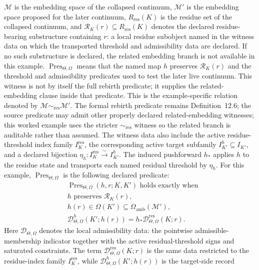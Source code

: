 \(\mathcal{M}\) is the embedding space of the collapsed continuum,
\(\mathcal{M}'\) is the embedding space proposed for the later continuum,
\(R_{\mathrm{res}}(K)\) is the residue set of the collapsed continuum, and
\(\mathcal{R}_K(r)\subseteq R_{\mathrm{res}}(K)\) denotes the declared
residue-bearing substructure containing \(r\): a local residue subobject named
in the witness data on which the transported threshold and admissibility data
are declared. If no such substructure is declared, the related embedding
branch is not available in this example.
\(\operatorname{Pres}_{\Theta,\Omega}\) means that the named map \(h\)
preserves \(\mathcal{R}_K(r)\) and the threshold and admissibility
predicates used to test the later live continuum. This witness is not by
itself the full rebirth predicate; it supplies the related-embedding clause
inside that predicate. This is the
example-specific relation denoted by
\(\mathcal{M}\sim_{\mathrm{res}}\mathcal{M}'\). The formal rebirth predicate
remains Definition~12.6; the source predicate may admit other properly
declared
related-embedding witnesses; this worked example uses the stricter
\(\sim_{\mathrm{res}}\) witness so the related branch is auditable rather than
assumed.
The witness data also include the active residue-threshold index family
\(I_K^{\mathrm{res}}\), the corresponding active target subfamily
\(I_{K'}^{h}\subseteq I_{K'}\), and a declared bijection
\(\eta_h:I_K^{\mathrm{res}}\xrightarrow{\sim}I_{K'}^{h}\). The induced
pushforward \(h_\ast\) applies \(h\) to the residue state and transports each
named residual threshold by \(\eta_h\).
For this example, \(\operatorname{Pres}_{\Theta,\Omega}\) is the following
declared predicate:
\[
\begin{aligned}
&\operatorname{Pres}_{\Theta,\Omega}(h,r;K,K')
  \text{ holds exactly when}\\
&h \text{ preserves } \mathcal{R}_K(r),\\
&h(r)\in\Omega(K')\subseteq\Omega_{\mathrm{amb}}(\mathcal{M}'),\\
&\mathcal{D}^{h}_{\Theta,\Omega}(K';h(r))
  =h_{\ast}\mathcal{D}^{\mathrm{res}}_{\Theta,\Omega}(K;r).
\end{aligned}
\]
Here \(\mathcal{D}_{\Theta,\Omega}\) denotes the local admissibility data:
the pointwise admissible-membership indicator together with the active residual-threshold signs
and saturated constraints. The term
\(\mathcal{D}^{\mathrm{res}}_{\Theta,\Omega}(K;r)\) is the same data restricted
to the residue-index family \(I_K^{\mathrm{res}}\), while
\(\mathcal{D}^{h}_{\Theta,\Omega}(K';h(r))\) is the target-side record
